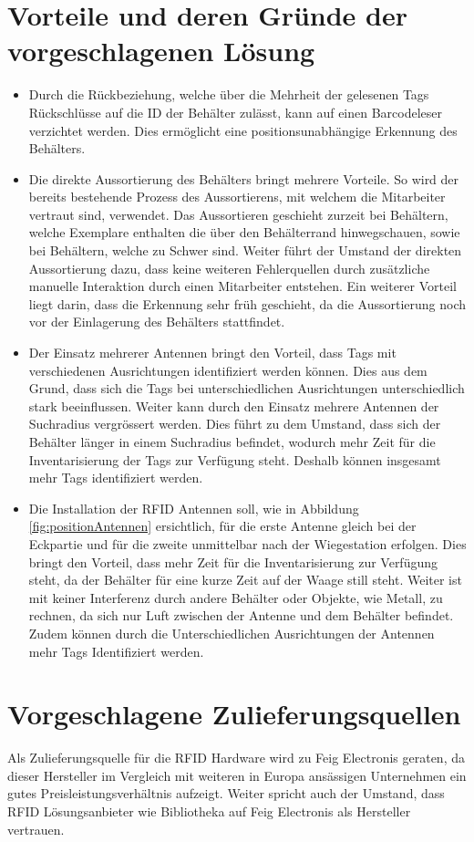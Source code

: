 \section{Vorteile und deren Gründe der vorgeschlagenen Lösung}
\begin{itemize}
	\item Durch die Rückbeziehung, welche über die Mehrheit der gelesenen Tags Rückschlüsse auf die ID der Behälter zulässt, kann auf einen Barcodeleser verzichtet werden. Dies ermöglicht eine positionsunabhängige Erkennung des Behälters.
	\item Die direkte Aussortierung des Behälters bringt mehrere Vorteile. So wird der bereits bestehende Prozess des Aussortierens, mit welchem die Mitarbeiter vertraut sind, verwendet. Das Aussortieren geschieht zurzeit bei Behältern, welche Exemplare enthalten die über den Behälterrand hinwegschauen, sowie bei Behältern, welche zu Schwer sind. Weiter führt der Umstand der direkten Aussortierung dazu, dass keine weiteren Fehlerquellen durch zusätzliche manuelle Interaktion durch einen Mitarbeiter entstehen. Ein weiterer Vorteil liegt darin, dass die Erkennung sehr früh geschieht, da die Aussortierung noch vor der Einlagerung des Behälters stattfindet.
	\item Der Einsatz mehrerer Antennen bringt den Vorteil, dass Tags mit verschiedenen Ausrichtungen identifiziert werden können. Dies aus dem Grund, dass sich die Tags bei unterschiedlichen Ausrichtungen unterschiedlich stark beeinflussen. Weiter kann durch den Einsatz mehrere Antennen der Suchradius vergrössert werden. Dies führt zu dem Umstand, dass sich der Behälter länger in einem Suchradius befindet, wodurch mehr Zeit für die Inventarisierung der Tags zur Verfügung steht. Deshalb können insgesamt mehr Tags identifiziert  werden.
	\item Die Installation der RFID Antennen soll, wie in Abbildung \ref{fig:positionAntennen} ersichtlich, für die erste Antenne gleich bei der Eckpartie und für die zweite unmittelbar nach der Wiegestation erfolgen. Dies bringt den Vorteil, dass mehr Zeit für die Inventarisierung zur Verfügung steht, da der Behälter für eine kurze Zeit auf der Waage still steht. Weiter ist mit keiner Interferenz durch andere Behälter oder Objekte, wie Metall, zu rechnen, da sich nur Luft zwischen der Antenne und dem Behälter befindet. Zudem können durch die Unterschiedlichen Ausrichtungen der Antennen mehr Tags Identifiziert werden.
\end{itemize}


\section{Vorgeschlagene Zulieferungsquellen}
Als Zulieferungsquelle für die RFID Hardware wird zu Feig Electronis geraten, da dieser Hersteller im Vergleich mit weiteren in Europa ansässigen Unternehmen ein gutes Preisleistungsverhältnis aufzeigt. Weiter spricht auch der Umstand, dass RFID Lösungsanbieter wie Bibliotheka auf Feig Electronis als Hersteller vertrauen.

